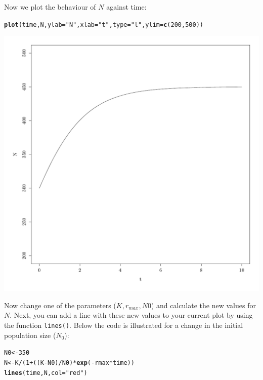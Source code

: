 \documentclass{article}\usepackage[]{graphicx}\usepackage[]{color}
\makeatletter
\def\maxwidth{ %
  \ifdim\Gin@nat@width>\linewidth
    \linewidth
  \else
    \Gin@nat@width
  \fi
}
\newcommand{\hlnum}[1]{\textcolor[rgb]{0.686,0.059,0.569}{#1}}%
\newcommand{\hlstr}[1]{\textcolor[rgb]{0.192,0.494,0.8}{#1}}%
\newcommand{\hlopt}[1]{\textcolor[rgb]{0,0,0}{#1}}%
\newcommand{\hlstd}[1]{\textcolor[rgb]{0.345,0.345,0.345}{#1}}%
\newcommand{\hlkwb}[1]{\textcolor[rgb]{0.69,0.353,0.396}{#1}}%
\newcommand{\hlkwc}[1]{\textcolor[rgb]{0.333,0.667,0.333}{#1}}%
\newcommand{\hlkwd}[1]{\textcolor[rgb]{0.737,0.353,0.396}{\textbf{#1}}}%
\newenvironment{kframe}{%
 \def\at@end@of@kframe{}%
 \ifinner\ifhmode%
  \def\at@end@of@kframe{\end{minipage}}%
  \begin{minipage}{\columnwidth}%
 \fi\fi%
 \def\FrameCommand##1{\hskip\@totalleftmargin \hskip-\fboxsep
 \colorbox{shadecolor}{##1}\hskip-\fboxsep
     \hskip-\linewidth \hskip-\@totalleftmargin \hskip\columnwidth}%
 \MakeFramed {\advance\hsize-\width
   \@totalleftmargin\z@ \linewidth\hsize
   \@setminipage}}%
 {\par\unskip\endMakeFramed%
 \at@end@of@kframe}
\newenvironment{knitrout}{}{} %
\makeatother
\begin{document}
Now we plot the behaviour of $N$ against time:
\begin{knitrout}
\color{fgcolor}\begin{kframe}
\begin{alltt}
\hlkwd{plot}\hlstd{(time, N,} \hlkwc{ylab}\hlstd{=}\hlstr{"N"}\hlstd{,} \hlkwc{xlab}\hlstd{=}\hlstr{"t"}\hlstd{,} \hlkwc{type}\hlstd{=}\hlstr{"l"}\hlstd{,} \hlkwc{ylim}\hlstd{=}\hlkwd{c}\hlstd{(}\hlnum{200}\hlstd{,}\hlnum{500}\hlstd{))}
\end{alltt}
\end{kframe}
\includegraphics[width=\maxwidth]{figure/k9-1} 

\end{knitrout}
Now change one of the parameters ($K,r_{max},N0$) and calculate the new values for $N$. Next, you can add a line with these new values to your current plot by using the function \texttt{lines()}. Below the code is illustrated for a change in the initial population size ($N_0$):
\begin{knitrout}
\color{fgcolor}\begin{kframe}
\begin{alltt}
\hlstd{N0}\hlkwb{<-}\hlnum{350}
\hlstd{N}\hlkwb{<-}\hlstd{K}\hlopt{/}\hlstd{(}\hlnum{1}\hlopt{+}\hlstd{((K}\hlopt{-}\hlstd{N0)}\hlopt{/}\hlstd{N0)}\hlopt{*}\hlkwd{exp}\hlstd{(}\hlopt{-}\hlstd{rmax}\hlopt{*}\hlstd{time))}
\hlkwd{lines}\hlstd{(time,N,}\hlkwc{col}\hlstd{=}\hlstr{"red"}\hlstd{)}
\end{alltt}
\end{kframe}
\end{knitrout}
\end{document}
